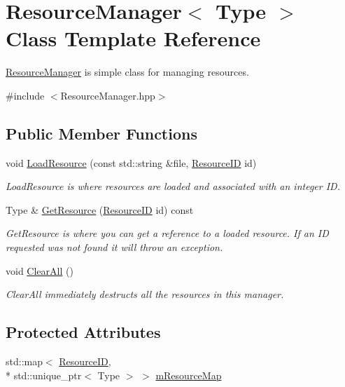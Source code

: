 \hypertarget{class_resource_manager}{\section{Resource\-Manager$<$ Type $>$ Class Template Reference}
\label{class_resource_manager}
}


\hyperlink{class_resource_manager}{Resource\-Manager} is simple class for managing resources.  




{\ttfamily \#include $<$Resource\-Manager.\-hpp$>$}

\subsection*{Public Member Functions}
\begin{DoxyCompactItemize}
\item 
void \hyperlink{class_resource_manager_a38f6162e5f7d3b16273a23340b34e438}{Load\-Resource} (const std\-::string \&file, \hyperlink{_resource_manager_8hpp_adfdcfc7f1686e261462215a5a516110e}{Resource\-I\-D} id)
\begin{DoxyCompactList}\small\item\em Load\-Resource is where resources are loaded and associated with an integer I\-D. \end{DoxyCompactList}\item 
Type \& \hyperlink{class_resource_manager_af3e977ad6ea9972aebf6c7d7c15a19d6}{Get\-Resource} (\hyperlink{_resource_manager_8hpp_adfdcfc7f1686e261462215a5a516110e}{Resource\-I\-D} id) const 
\begin{DoxyCompactList}\small\item\em Get\-Resource is where you can get a reference to a loaded resource. If an I\-D requested was not found it will throw an exception. \end{DoxyCompactList}\item 
void \hyperlink{class_resource_manager_a919997a4e1b07f62181bedad680915aa}{Clear\-All} ()
\begin{DoxyCompactList}\small\item\em Clear\-All immediately destructs all the resources in this manager. \end{DoxyCompactList}\end{DoxyCompactItemize}
\subsection*{Protected Attributes}
\begin{DoxyCompactItemize}
\item 
std\-::map$<$ \hyperlink{_resource_manager_8hpp_adfdcfc7f1686e261462215a5a516110e}{Resource\-I\-D}, \\*
std\-::unique\-\_\-ptr$<$ Type $>$ $>$ \hyperlink{class_resource_manager_af7f7accf221f620d9816ad3cfb80674e}{m\-Resource\-Map}
\end{DoxyCompactItemize}



